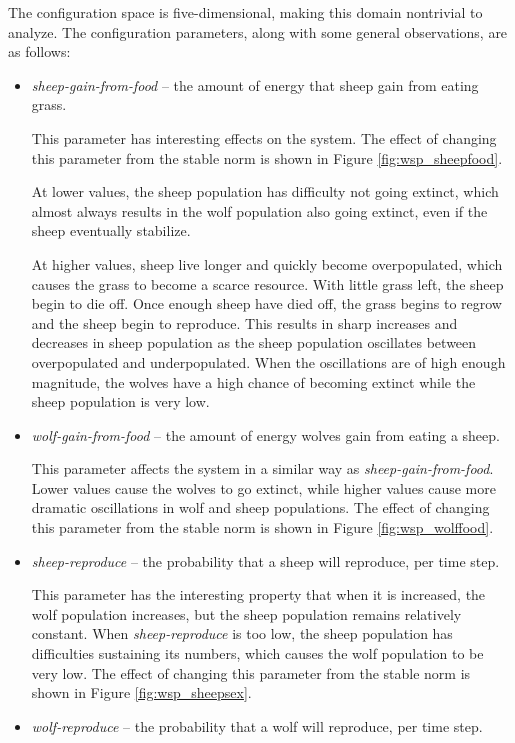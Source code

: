 The configuration space is five-dimensional, making this domain nontrivial to analyze.
The configuration parameters, along with some general observations, are as follows:
\begin{itemize}
   \item \textit{sheep-gain-from-food} -- the amount of energy that sheep gain from eating grass.

This parameter has interesting effects on the system.
The effect of changing this parameter from the stable norm is shown in Figure \ref{fig:wsp_sheepfood}.

At lower values, the sheep population has difficulty not going extinct, which almost always results in the wolf population also going extinct, even if the sheep eventually stabilize.

At higher values, sheep live longer and quickly become overpopulated, which causes the grass to become a scarce resource.
With little grass left, the sheep begin to die off.
Once enough sheep have died off, the grass begins to regrow and the sheep begin to reproduce.
This results in sharp increases and decreases in sheep population as the sheep population oscillates between overpopulated and underpopulated.
When the oscillations are of high enough magnitude, the wolves have a high chance of becoming extinct while the 
sheep population is very low.


   \item \textit{wolf-gain-from-food} -- the amount of energy wolves gain from eating a sheep.

This parameter affects the system in a similar way as \textit{sheep-gain-from-food}.
Lower values cause the wolves to go extinct, while higher values cause more dramatic oscillations in wolf and sheep populations.
The effect of changing this parameter from the stable norm is  shown in Figure \ref{fig:wsp_wolffood}.

   \item \textit{sheep-reproduce} -- the probability that a sheep will reproduce, per time step.

This parameter has the interesting property that when it is increased, the wolf population increases, but the sheep population remains relatively constant.
When \textit{sheep-reproduce} is too low, the sheep population has difficulties sustaining its numbers, which causes the wolf population to be very low.
The effect of changing this parameter from the stable norm is  shown in Figure \ref{fig:wsp_sheepsex}.

   \item \textit{wolf-reproduce} -- the probability that a wolf will reproduce, per time step.


\end{itemize}
